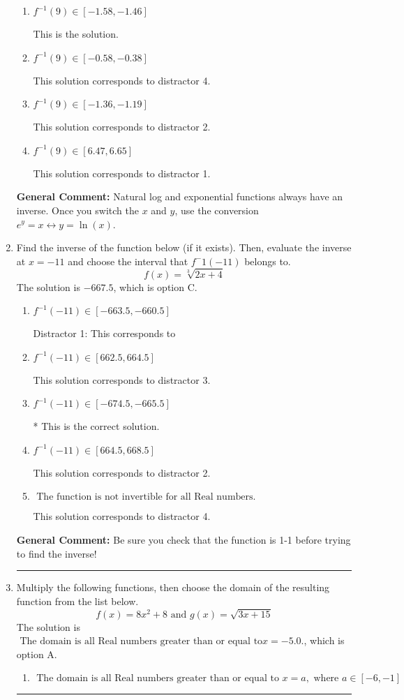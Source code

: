 \documentclass{extbook}[14pt]
\newcommand{\litem}[1]{\item #1

\rule{\textwidth}{0.4pt}}
\begin{document}
\begin{enumerate}
{\begin{enumerate}[label=\Alph*.]
 This solution corresponds to distractor 3.
\item \( f^{-1}(9) \in [-1.58, -1.46] \)

 This is the solution.
\item \( f^{-1}(9) \in [-0.58, -0.38] \)

 This solution corresponds to distractor 4.
\item \( f^{-1}(9) \in [-1.36, -1.19] \)

 This solution corresponds to distractor 2.
\item \( f^{-1}(9) \in [6.47, 6.65] \)

 This solution corresponds to distractor 1.
\end{enumerate}

\textbf{General Comment:} Natural log and exponential functions always have an inverse. Once you switch the $x$ and $y$, use the conversion $ e^y = x \leftrightarrow y=\ln(x)$.
}
\litem{
Find the inverse of the function below (if it exists). Then, evaluate the inverse at $x = -11$ and choose the interval that $f^-1(-11)$ belongs to.
\[ f(x) = \sqrt[3]{2 x + 4} \]The solution is \( -667.5 \), which is option C.\begin{enumerate}[label=\Alph*.]
\item \( f^{-1}(-11) \in [-663.5, -660.5] \)

 Distractor 1: This corresponds to 
\item \( f^{-1}(-11) \in [662.5, 664.5] \)

 This solution corresponds to distractor 3.
\item \( f^{-1}(-11) \in [-674.5, -665.5] \)

* This is the correct solution.
\item \( f^{-1}(-11) \in [664.5, 668.5] \)

 This solution corresponds to distractor 2.
\item \( \text{ The function is not invertible for all Real numbers. } \)

 This solution corresponds to distractor 4.
\end{enumerate}

\textbf{General Comment:} Be sure you check that the function is 1-1 before trying to find the inverse!
}
\litem{
Multiply the following functions, then choose the domain of the resulting function from the list below.
\[ f(x) = 8x^{2} + 8 \text{ and } g(x) = \sqrt{3x+15}  \]The solution is \( \text{ The domain is all Real numbers greater than or equal to} x = -5.0. \), which is option A.\begin{enumerate}[label=\Alph*.]
\item \( \text{ The domain is all Real numbers greater than or equal to } x = a, \text{ where } a \in [-6, -1] \)



\end{enumerate}}
\end{enumerate}
\end{document}
